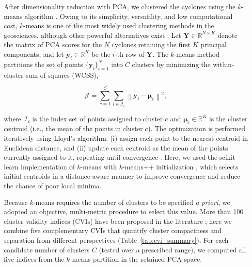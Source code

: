 \documentclass[pdflatex,sn-chicago]{sn-jnl}%
\theoremstyle{plain}
\theoremstyle{definition}
\theoremstyle{remark}
\theoremstyle{definition}
\begin{document}
After dimensionality reduction with PCA, we clustered the cyclones using the $k$-means algorithm \citep{macqueen1967}. Owing to its simplicity, versatility, and low computational cost, $k$-means is one of the most widely used clustering methods in the geosciences, although other powerful alternatives exist \citep[e.g.,][]{fachieri2025introduccao}. Let $\mathbf{Y}\in\mathbb{R}^{N\times K}$ denote the matrix of PCA scores for the $N$ cyclones retaining the first $K$ principal components, and let $\mathbf{y}_i\in\mathbb{R}^{K}$ be the $i$-th row of $\mathbf{Y}$. The $k$-means method partitions the set of points $\{\mathbf{y}_i\}_{i=1}^{N}$ into $C$ clusters by minimizing the within-cluster sum of squares (WCSS),

\begin{equation}
\mathcal{J} = \sum_{c=1}^{C}\sum_{i \in \mathcal{I}_c}\left\lVert \mathbf{y}_i - \boldsymbol{\mu}_c \right\rVert^2,
\end{equation}

where $\mathcal{I}_c$ is the index set of points assigned to cluster $c$ and $\boldsymbol{\mu}_c\in\mathbb{R}^{K}$ is the cluster centroid (i.e., the mean of the points in cluster $c$). The optimization is performed iteratively using Lloyd's algorithm: (i) assign each point to the nearest centroid in Euclidean distance, and (ii) update each centroid as the mean of the points currently assigned to it, repeating until convergence \citep{lloyd1982least}. Here, we used the scikit-learn implementation of $k$-means with $k$-means++ initialization \citep{arthur2006k}, which selects initial centroids in a distance-aware manner to improve convergence and reduce the chance of poor local minima.

Because $k$-means requires the number of clusters to be specified \emph{a priori}, we adopted an objective, multi-metric procedure to select this value. More than 100 cluster validity indices (CVIs) have been proposed in the literature \citep{arbelaitz2013extensive,hassan2024z}; here we combine five complementary CVIs that quantify cluster compactness and separation from different perspectives (Table~\ref{tab:cvi_summary}). For each candidate number of clusters $C$ (tested over a prescribed range), we computed all five indices from the $k$-means partition in the retained PCA space.
\end{document}
